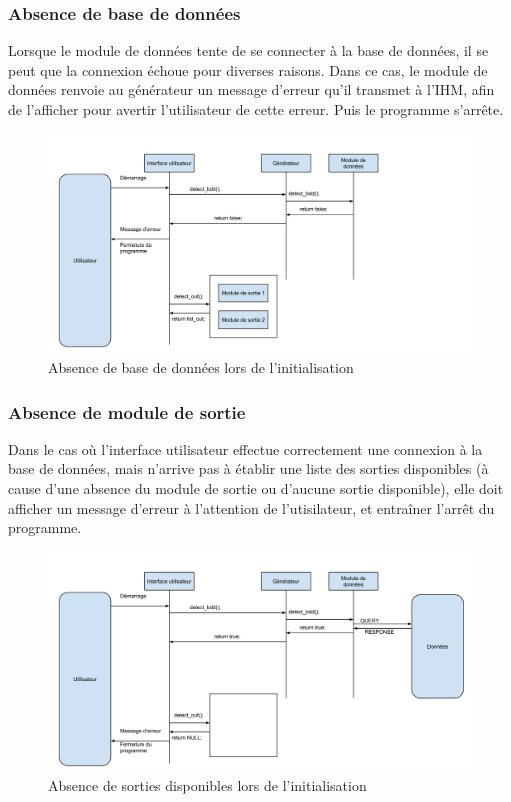 \subsubsection{Absence de base de données}
        
Lorsque le module de données tente de se connecter à la base de données, il 
se peut que la connexion échoue pour diverses raisons. Dans ce cas, le 
module de données renvoie au générateur un message d'erreur qu'il transmet à
 l'IHM, afin de l'afficher pour avertir l'utilisateur de cette erreur. Puis 
 le programme s'arrête.
        
\begin{figure}[!h]
\includegraphics[width=14cm]{data/demarrage_absence_bdd.png}
\caption{Absence de base de données lors de l'initialisation}
\end{figure}
        
\subsubsection{Absence de module de sortie}

Dans le cas où l'interface utilisateur effectue correctement une connexion à 
la base de données, mais n'arrive pas à établir une liste des sorties 
disponibles (à cause d'une absence du module de sortie ou d'aucune sortie 
disponible), elle doit afficher un message d'erreur à l'attention de 
l'utisilateur, et entraîner l'arrêt du programme.
        
\begin{figure}[!h]
\includegraphics[width=14cm]{data/demarrage_absence_sortie.png}
\caption{Absence de sorties disponibles lors de l'initialisation}
\end{figure}
 
